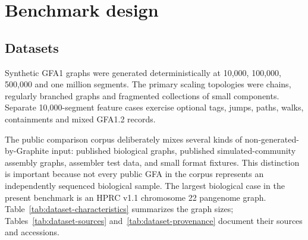 \documentclass[11pt]{article}
\begin{document}
\section{Benchmark design}
\subsection{Datasets}
Synthetic GFA1 graphs were generated deterministically at 10,000, 100,000, 500,000 and one million segments. The primary scaling topologies were chains, regularly branched graphs and fragmented collections of small components. Separate 10,000-segment feature cases exercise optional tags, jumps, paths, walks, containments and mixed GFA1.2 records.

The public comparison corpus deliberately mixes several kinds of non-generated-by-Graphite input: published biological graphs, published simulated-community assembly graphs, assembler test data, and small format fixtures. This distinction is important because not every public GFA in the corpus represents an independently sequenced biological sample. The largest biological case in the present benchmark is an HPRC v1.1 chromosome 22 pangenome graph. Table~\ref{tab:dataset-characteristics} summarizes the graph sizes; Tables~\ref{tab:dataset-sources} and~\ref{tab:dataset-provenance} document their sources and accessions.
\end{document}
